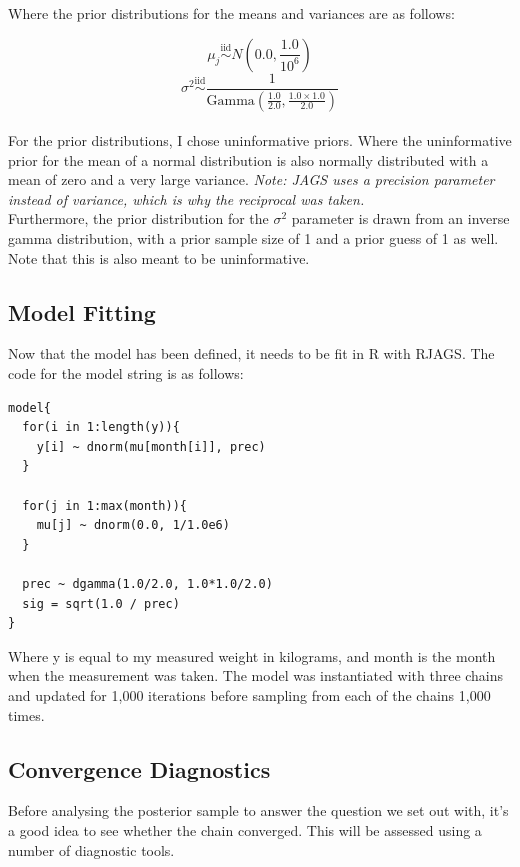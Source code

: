 \documentclass[journal, a4paper]{IEEEtran}
\begin{document}
Where the prior distributions for the means and variances are as follows:

$$\mu_j \overset{\text{iid}}{\sim} N\left(0.0, \frac{1.0}{10^6}\right)$$
$$\sigma^2 \overset{\text{iid}}{\sim} \frac{1}{\textrm{Gamma}(\frac{1.0}{2.0}, \frac{1.0 \times 1.0}{2.0})} $$\\

For the prior distributions, I chose uninformative priors. Where the uninformative prior for the mean of a normal distribution is also normally distributed with
a mean of zero and a very large variance. \textit{Note: JAGS uses a precision parameter instead of variance, which is why the reciprocal was taken.}\\

Furthermore, the prior distribution for the $\sigma^2$ parameter is drawn from an inverse gamma distribution, with a prior sample size of 1 and a prior guess of
1 as well. Note that this is also meant to be uninformative.

\subsection{Model Fitting}

Now that the model has been defined, it needs to be fit in R with RJAGS. The code for the model string is as follows:\\

\begin{lstlisting}
model{
  for(i in 1:length(y)){
    y[i] ~ dnorm(mu[month[i]], prec)
  }
  
  for(j in 1:max(month)){
    mu[j] ~ dnorm(0.0, 1/1.0e6)
  }
  
  prec ~ dgamma(1.0/2.0, 1.0*1.0/2.0)
  sig = sqrt(1.0 / prec)
}
\end{lstlisting}

Where y is equal to my measured weight in kilograms, and month is the month when the measurement was taken. The model was instantiated with three chains and 
updated for 1,000 iterations before sampling from each of the chains 1,000 times.

\subsection{Convergence Diagnostics}

Before analysing the posterior sample to answer the question we set out with, it's a good idea to see whether the chain converged. This will be assessed using
a number of diagnostic tools.\\
\end{document}
